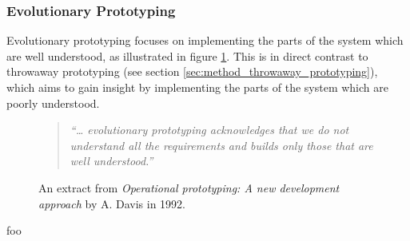 
\subsubsection{Evolutionary Prototyping}

Evolutionary prototyping focuses on implementing the parts of the system which are well understood, as illustrated in figure \ref{fig:evolutionary_prototyping}. This is in direct contrast to throwaway prototyping (see section \ref{sec:method_throwaway_prototyping}), which aims to gain insight by implementing the parts of the system which are poorly understood.

\begin{figure}[htbp]
	\begin{quote}
		\textit{``… evolutionary prototyping acknowledges that we do not understand all the requirements and builds only those that are well understood.''} \cite{operational_prototyping}
	\end{quote}
	\caption{An extract from \textit{Operational prototyping: A new development approach} by A. Davis in 1992.}
	\label{fig:evolutionary_prototyping}
\end{figure}






foo
